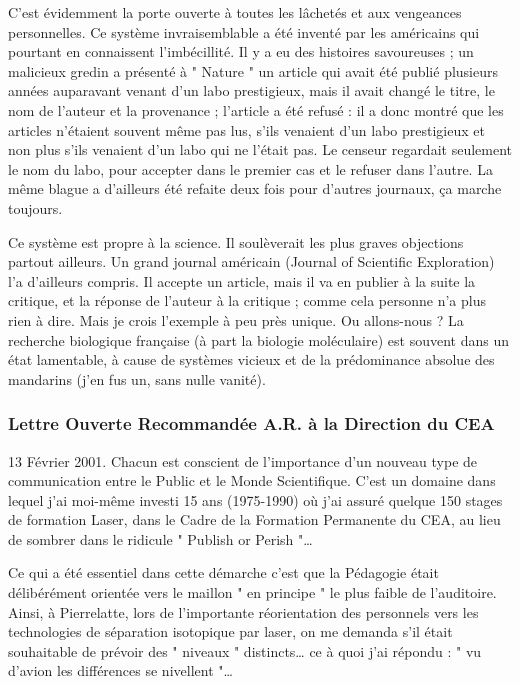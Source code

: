 \documentclass[a4paper,12pt]{article}
\begin{document}
C’est évidemment la porte ouverte à toutes les lâchetés et aux vengeances personnelles. Ce système invraisemblable a été inventé par les américains qui pourtant en connaissent l’imbécillité. Il y a eu des histoires savoureuses ; un malicieux gredin a présenté à " Nature " un article qui avait été publié plusieurs années auparavant venant d’un labo prestigieux, mais il avait changé le titre, le nom de l’auteur et la provenance ; l’article a été refusé : il a donc montré que les articles n’étaient souvent même pas lus, s’ils venaient d’un labo prestigieux et non plus s’ils venaient d’un labo qui ne l’était pas. Le censeur regardait seulement le nom du labo, pour accepter dans le premier cas et le refuser dans l’autre. La même blague a d’ailleurs été refaite deux fois pour d’autres journaux, ça marche toujours.


Ce système est propre à la science. Il soulèverait les plus graves objections partout ailleurs. Un grand journal américain (Journal of Scientific Exploration) l’a d’ailleurs compris. Il accepte un article, mais il va en publier à la suite la critique, et la réponse de l’auteur à la critique ; comme cela personne n’a plus rien à dire. Mais je crois l’exemple à peu près unique.
Ou allons-nous ? La recherche biologique française (à part la biologie moléculaire) est souvent dans un état lamentable, à cause de systèmes vicieux et de la prédominance absolue des mandarins (j’en fus un, sans nulle vanité). 


\subsubsection{ Lettre Ouverte Recommandée A.R. à la Direction du CEA  }

13 Février 2001. Chacun est conscient de l’importance d’un nouveau type de communication entre le Public et le Monde Scientifique. C’est un domaine dans lequel j’ai moi-même investi 15 ans (1975-1990) où j’ai assuré quelque 150 stages de formation Laser, dans le Cadre de la Formation Permanente du CEA, au lieu de sombrer dans le ridicule " Publish or Perish "…

Ce qui a été essentiel dans cette démarche c’est que la Pédagogie était délibérément orientée vers le maillon " en principe " le plus faible de l’auditoire. Ainsi, à Pierrelatte, lors de l’importante réorientation des personnels vers les technologies de séparation isotopique par laser, on me demanda s’il était souhaitable de prévoir des " niveaux " distincts… ce à quoi j’ai répondu : " vu d’avion les différences se nivellent "… 
\end{document}
